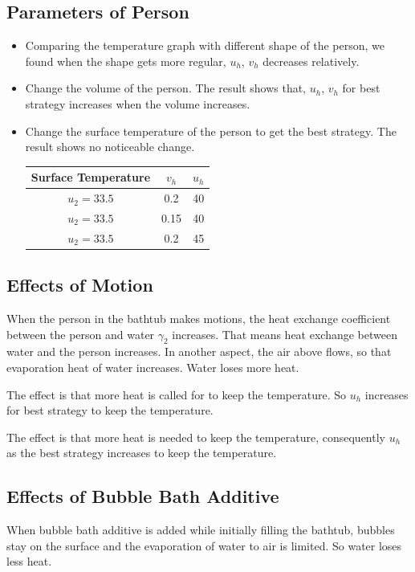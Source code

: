 \documentclass[12pt,a4paper,titlepage]{article}
\begin{document}
\subsection{Parameters of Person}
\label{sec:parameters of person}
\begin{itemize}
\item Comparing the temperature graph with different shape of the person, we found when the shape gets more regular, $u_h$, $v_h$ decreases relatively.
\item Change the volume of the person. The result shows that, $u_h$, $v_h$ for best strategy increases when the volume increases.
\item Change the surface temperature of the person to get the best strategy. The result shows no noticeable change.
    \begin{center}
\begin{tabular}{c|c|c}
\hline
 Surface Temperature     &$v_h$  &$u_h$        \\ \hline
 $u_2=33.5$    &0.2             & 40              \\ \hline
 $u_2=33.5$    &0.15            & 40              \\ \hline
 $u_2=33.5$  &0.2             & 45              \\ \hline
\end{tabular}
\end{center}
\end{itemize}

\subsection{Effects of Motion}
\label{sec:effects of motion}
When the person in the bathtub makes motions, the heat exchange coefficient between the person and water ${\gamma}_2$ increases. That means heat exchange between water and the person increases. In another aspect, the air above flows, so that evaporation heat of water increases. Water loses more heat.

The effect is that more heat is called for to keep the temperature. So $u_h$ increases for best strategy to keep the temperature.

The effect is that more heat is needed to keep the temperature, consequently $u_h$ as the best strategy increases to keep the temperature.

\subsection{Effects of Bubble Bath Additive}
\label{sec:effects of bubble bath additive}
When bubble bath additive is added while initially filling the bathtub, bubbles stay on the surface and the evaporation of water to air is limited. So water loses less heat.
\end{document}
